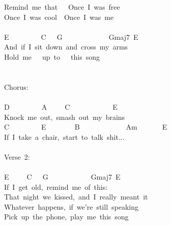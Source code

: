 {Remind\ me\ that\ \ \ Once\ I\ was\ free\\
Once\ I\ was\ cool\ \ Once\ I\ was\ me\\
\\
E\ \ \ \ \ \ \ \ \ C\ \ \ G\ \ \ \ \ \ \ \ \ \ \ \ \ Gmaj7\ E\\
And\ if\ I\ sit\ down\ and\ cross\ my\ arms\\
Hold\ me\ \ \ up\ to\ \ \ this\ song\\
\\
\\
Chorus:\\
\\
D\ \ \ \ \ \ \ \ \ A\ \ \ \ \ C\ \ \ \ \ \ \ \ \ \ \ \ E\\
Knock\ me\ out,\ smash\ out\ my\ brains\\
C\ \ \ \ \ \ \ \ \ E\ \ \ \ \ \ \ \ B\ \ \ \ \ \ \ \ \ \ \ \ \ Am\ \ \ \ \ \ \ E\\
If\ I\ take\ a\ chair,\ start\ to\ talk\ shit...\\
\\
Verse\ 2:\\
\\
E\ \ \ \ \ C\ \ \ G\ \ \ \ \ \ \ \ \ \ \ \ Gmaj7\ E\\
If\ I\ get\ old,\ remind\ me\ of\ this:\\
That\ night\ we\ kissed,\ and\ I\ really\ meant\ it\\
Whatever\ happens,\ if\ we're\ still\ speaking\\
Pick\ up\ the\ phone,\ play\ me\ this\ song}
